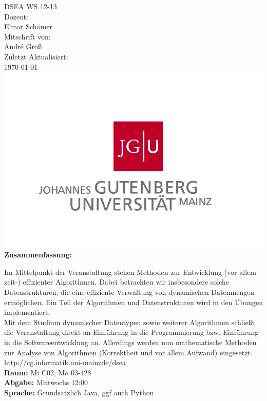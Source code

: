 \documentclass[a4paper,twoside,10pt]{report}
\begin{document}
\begin{titlepage}
\center
\Large DSEA WS 12-13\large \\[2em]
Dozent:\\Elmar Schömer\\[2em]
Mitschrift von:\\André Groß\\[2em]
Zuletzt Aktualisiert:\\\today\\
\includegraphics[scale=.2]{figures/uni_logo.png}\\[3em]
\Large \textbf{Zusammenfassung:}\\[1em]
\parbox{0.75\textwidth}{\large
Im Mittelpunkt der Veranstaltung stehen Methoden zur Entwicklung (vor allem \mbox{zeit-)} effizienter Algorithmen. Dabei betrachten wir insbesondere solche Datenstrukturen, die eine effiziente Verwaltung von dynamischen Datenmengen ermöglichen. Ein Teil der Algorithmen und Datenstrukturen wird in den Übungen implementiert.\\[.5em]

Mit dem Studium dynamischer Datentypen sowie weiterer Algorithmen schließt die Veranstaltung direkt an Einführung in die Programmierung bzw. Einführung in die Softwareentwicklung an. Allerdings werden nun mathematische Methoden zur Analyse von Algorithmen (Korrektheit und vor allem Aufwand) eingesetzt.\\[.5em]

http://cg.informatik.uni-mainzde/dsea\\
\textbf{Raum:} Mi C02, Mo 03-428\\
\textbf{Abgabe:} Mittwochs 12:00\\
\textbf{Sprache:} Grundsätzlich Java, ggf auch Python
}
\end{titlepage}
\normalsize
\tableofcontents
\twocolumn
\end{document}
